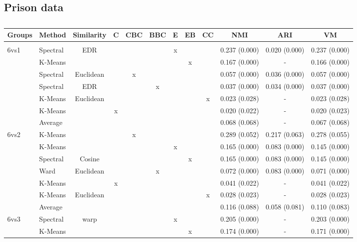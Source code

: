 \documentclass[12pt,a4paper,bibliography=totocnumbered,listof=totocnumbered]{scrartcl}
\begin{document}
{\begin{appendix}
\pagebreak
\section{Prison data}

\begin{table}[!htbp] \centering 
	\caption{} 
	\label{} 
	\scriptsize 
	\begin{tabular}{@{\extracolsep{0pt}} llcccccccccc} 
		\toprule
		Groups & Method & Similarity & C & CBC & BBC & E & EB & CC & NMI & ARI & VM \\ 
		\hline \\[-1.8ex] 
		6vs1 & Spectral & EDR &  &  &  & x &  &  & 0.237 (0.000) & 0.020 (0.000) & 0.237 (0.000) \\ 
		& K-Means &  &  &  &  &  & x &  & 0.167 (0.000) & - & 0.166 (0.000) \\ 
		& Spectral & Euclidean &  & x &  &  &  &  & 0.057 (0.000) & 0.036 (0.000) & 0.057 (0.000) \\ 
		& Spectral & EDR &  &  & x &  &  &  & 0.037 (0.000) & 0.034 (0.000) & 0.037 (0.000) \\ 
		& K-Means & Euclidean &  &  &  &  &  & x & 0.023 (0.028) & - & 0.023 (0.028) \\ 
		& K-Means &  & x &  &  &  &  &  & 0.020 (0.022) & - & 0.020 (0.023) \\ 
		& Average &  &  &  &  &  &  &  & 0.068 (0.068) & - & 0.067 (0.068) \\ 
		6vs2 & K-Means &  &  & x &  &  &  &  & 0.289 (0.052) & 0.217 (0.063) & 0.278 (0.055) \\ 
		& K-Means &  &  &  &  & x &  &  & 0.165 (0.000) & 0.083 (0.000) & 0.145 (0.000) \\ 
		& Spectral & Cosine &  &  &  &  & x &  & 0.165 (0.000) & 0.083 (0.000) & 0.145 (0.000) \\ 
		& Ward & Euclidean &  &  & x &  &  &  & 0.072 (0.000) & 0.083 (0.000) & 0.071 (0.000) \\ 
		& K-Means &  & x &  &  &  &  &  & 0.041 (0.022) & - & 0.041 (0.022) \\ 
		& K-Means & Euclidean &  &  &  &  &  & x & 0.028 (0.023) & - & 0.028 (0.023) \\ 
		& Average &  &  &  &  &  &  &  & 0.116 (0.088) & 0.058 (0.081) & 0.110 (0.083) \\ 
		6vs3 & Spectral & warp &  &  &  & x &  &  & 0.205 (0.000) & - & 0.203 (0.000) \\ 
		& K-Means &  &  &  &  &  & x &  & 0.174 (0.000) & - & 0.171 (0.000) \\ 

\end{tabular}
\end{table}
\end{appendix}}
\end{document}
